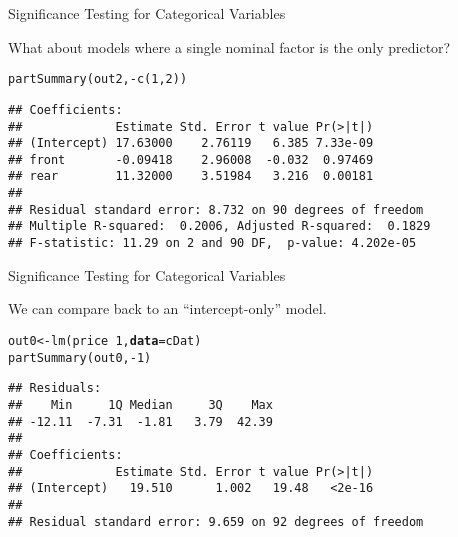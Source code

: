 \documentclass{beamer}\usepackage[]{graphicx}\usepackage[]{color}
\makeatletter
\newcommand{\hlnum}[1]{\textcolor[rgb]{0.69,0.494,0}{#1}}%
\newcommand{\hlopt}[1]{\textcolor[rgb]{0,0,0}{#1}}%
\newcommand{\hlstd}[1]{\textcolor[rgb]{0,0,0}{#1}}%
\newcommand{\hlkwb}[1]{\textcolor[rgb]{0,0.341,0.682}{#1}}%
\newcommand{\hlkwc}[1]{\textcolor[rgb]{0,0,0}{\textbf{#1}}}%
\newcommand{\hlkwd}[1]{\textcolor[rgb]{0.004,0.004,0.506}{#1}}%
\newenvironment{kframe}{%
 \def\at@end@of@kframe{}%
 \ifinner\ifhmode%
  \def\at@end@of@kframe{\end{minipage}}%
  \begin{minipage}{\columnwidth}%
 \fi\fi%
 \def\FrameCommand##1{\hskip\@totalleftmargin \hskip-\fboxsep
 \colorbox{shadecolor}{##1}\hskip-\fboxsep
     \hskip-\linewidth \hskip-\@totalleftmargin \hskip\columnwidth}%
 \MakeFramed {\advance\hsize-\width
   \@totalleftmargin\z@ \linewidth\hsize
   \@setminipage}}%
 {\par\unskip\endMakeFramed%
 \at@end@of@kframe}
\newenvironment{knitrout}{}{} %
\makeatother
\begin{document}

\begin{frame}[fragile]{Significance Testing for Categorical Variables}
  
  What about models where a single nominal factor is the only predictor?

\begin{knitrout}\footnotesize
{}\color{fgcolor}\begin{kframe}
\begin{alltt}
\hlkwd{partSummary}\hlstd{(out2,} \hlopt{-}\hlkwd{c}\hlstd{(}\hlnum{1}\hlstd{,} \hlnum{2}\hlstd{))}
\end{alltt}
\begin{verbatim}
## Coefficients:
##             Estimate Std. Error t value Pr(>|t|)
## (Intercept) 17.63000    2.76119   6.385 7.33e-09
## front       -0.09418    2.96008  -0.032  0.97469
## rear        11.32000    3.51984   3.216  0.00181
## 
## Residual standard error: 8.732 on 90 degrees of freedom
## Multiple R-squared:  0.2006,	Adjusted R-squared:  0.1829 
## F-statistic: 11.29 on 2 and 90 DF,  p-value: 4.202e-05
\end{verbatim}
\end{kframe}
\end{knitrout}
  
\end{frame}


\begin{frame}[fragile]{Significance Testing for Categorical Variables}
  
  We can compare back to an ``intercept-only'' model.
  
\begin{knitrout}\footnotesize
{}\color{fgcolor}\begin{kframe}
\begin{alltt}
\hlstd{out0} \hlkwb{<-} \hlkwd{lm}\hlstd{(price} \hlopt{~} \hlnum{1}\hlstd{,} \hlkwc{data} \hlstd{= cDat)}
\hlkwd{partSummary}\hlstd{(out0,} \hlopt{-}\hlnum{1}\hlstd{)}
\end{alltt}
\begin{verbatim}
## Residuals:
##    Min     1Q Median     3Q    Max 
## -12.11  -7.31  -1.81   3.79  42.39 
## 
## Coefficients:
##             Estimate Std. Error t value Pr(>|t|)
## (Intercept)   19.510      1.002   19.48   <2e-16
## 
## Residual standard error: 9.659 on 92 degrees of freedom
\end{verbatim}
\end{kframe}
\end{knitrout}

\end{frame}
\end{document}
